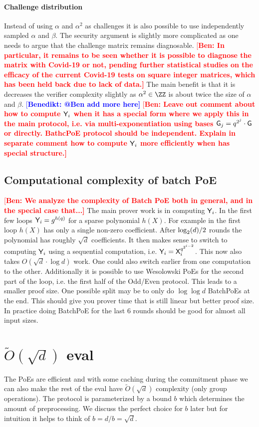 \documentclass[12pt]{article}
\theoremstyle{Definition}
\newcommand{\ben}[1]{{\textcolor{red}{[\bf Ben: #1]}}}
\newcommand{\benedikt}[1]{{\textcolor{blue}{[\bf Benedikt: #1]}}}
\newcommand{\ben}[1]{}
\begin{document}
\paragraph{Challenge distribution}
Instead of using $\alpha$ and $\alpha^2$ as challenges it is also possible to use independently sampled $\alpha$ and $\beta$. The security argument is slightly more complicated as one needs to argue that the challenge matrix remains diagnosable. \ben{In particular, it remains to be seen whether it is possible to diagnose the matrix with Covid-19 or not, pending further statistical studies on the efficacy of the current Covid-19 tests on square integer matrices, which has been held back due to lack of data.} The main benefit is that it is decreases the verifier complexity slightly as $\alpha^2 \in \ZZ$ is about twice the size of $\alpha$ and $\beta$. \benedikt{@Ben add more here}
\ben{Leave out comment about how to compute $\mathsf{Y}_i$ when it has a special form where we apply this in the main protocol, i.e. via multi-exponentiation using bases $\mathsf{G}_j=q^{ 2^{j}} \cdot \mathsf{G}$ or directly. BathcPoE protocol should be independent. Explain in separate comment how to compute $\mathsf{Y}_i$ more efficiently when has special structure.}

\subsection{Computational complexity of batch PoE}
\ben{We analyze the complexity of Batch PoE both in general, and in the special case that...} The main prover work is in computing $\mathsf{Y}_i$. In the first few loops $\mathsf{Y}_i=g^{h(q)}$ for a sparse polynomial $h(X)$. For example in the first loop $h(X)$ has only a single non-zero coefficient.
After $\log_2(d)/2$ rounds the polynomial has roughly $\sqrt{d}$ coefficients. It then makes sense to switch to computing $\mathsf{Y}_i$ using a sequential computation, i.e. $\mathsf{Y}_i=\mathsf{X}_i^{q^{2^{i-2}}}$. This now also takes $O(\sqrt{d}\cdot \log{d})$ work. One could also switch earlier from one computation to the other. Additionally it is possible to use Wesolowski PoEs for the second part of the loop, i.e. the first half of the Odd/Even protocol. This leads to a smaller proof size. One possible split may be to only do $\log{\log{d}}$ BatchPoEs at the end. This should give you prover time that is still linear but better proof size. In practice doing BatchPoE for the last $6$ rounds should be good for almost all input sizes.
\section{$\tilde{O}(\sqrt{d})$ eval}
The PoEs are efficient and with some caching during the commitment phase we can also make the rest of the eval have $\tilde{O}(\sqrt{d})$ complexity (only group operations). The protocol is parameterized by a bound $b$ which determines the amount of preprocessing. We discuss the perfect choice for $b$ later but for intuition it helps to think of $b=d/b=\sqrt{d}$.
\end{document}
